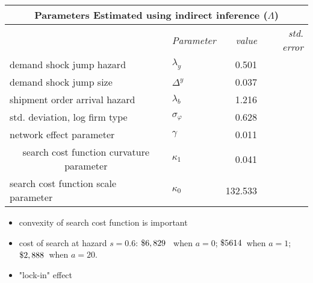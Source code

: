 \documentclass[notes=show]{beamer}
\begin{document}
\begin{frame}%


\begin{center}
{\small 
\begin{tabular}{llrr}
\multicolumn{4}{c}{\textbf{Parameters Estimated using indirect inference (}$%
\Lambda $\textbf{)}} \\ \hline\hline
& \textit{Parameter} & \textit{value} & \textit{std. error} \\ \cline{2-4}
demand shock jump hazard                                     & $\lambda _{y}$       & 0.501    &       \\
demand shock jump size                                       & $\Delta ^{y}$        & 0.037    &       \\
shipment order arrival hazard                                & $\lambda _{b}$       & 1.216    &       \\
std. deviation, log firm type                                & $\sigma _{\varphi }$ & 0.628    &       \\
network effect parameter                                     & $\gamma $            & 0.011    &       \\
\multicolumn{1}{c}{search cost function curvature parameter} & $\kappa _{1}$
                                                             & 0.041                &                  \\
search cost function scale parameter                         & $\kappa _{0}$        & 132.533  &       \\
\hline
\end{tabular}%
}
\end{center}

\begin{itemize}
\item {\small convexity of search cost function is important}

\item {\small cost of search at hazard }$s=0.6${\small : }${\small \$6,829}$%
{\small \ when }$a=0${\small ; }${\small \$5614}${\small \ when }$a=1${\small ; }${\small \$2,888}${\small \ when } $a=20.$

\item {\small "lock-in" effect}
\end{itemize}

\end{frame}%
\end{document}
